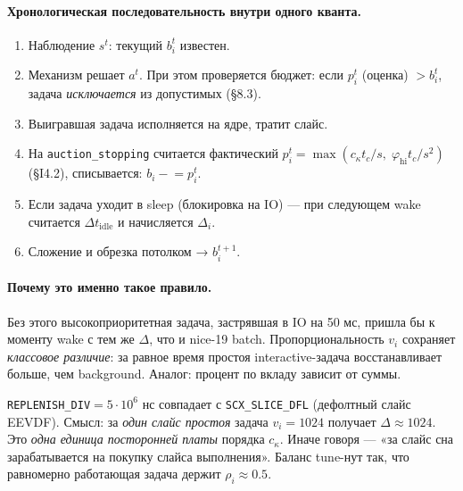 \documentclass[11pt,a4paper]{article}
\begin{document}
\paragraph{Хронологическая последовательность внутри одного кванта.}
\begin{enumerate}[leftmargin=*]
  \item Наблюдение $s^t$: текущий $b_i^t$ известен.
  \item Механизм решает $a^t$. При этом проверяется бюджет:
    если $p_i^t$ (оценка) $> b_i^t$, задача \emph{исключается} из
    допустимых (§8.3).
  \item Выигравшая задача исполняется на ядре, тратит слайс.
  \item На \texttt{auction\_stopping} считается фактический
    $p_i^t = \max(c_\kappa t_c/s,\; \varphi_{\text{hi}} t_c/s^2)$
    (§I4.2), списывается: $b_i \mathrel{-}= p_i^t$.
  \item Если задача уходит в sleep (блокировка на IO) — при
    следующем wake считается $\Delta t_{\text{idle}}$ и начисляется
    $\Delta_i$.
  \item Сложение и обрезка потолком → $b_i^{t+1}$.
\end{enumerate}

\paragraph{Почему это именно такое правило.}

\begin{why}
Без этого высокоприоритетная задача, застрявшая в IO на 50 мс,
пришла бы к моменту wake с тем же $\Delta$, что и nice-19 batch.
Пропорциональность $v_i$ сохраняет \emph{классовое различие}: за
равное время простоя interactive-задача восстанавливает больше,
чем background. Аналог: процент по вкладу зависит от суммы.
\end{why}

\begin{why}[Откуда берётся $D_{\text{rep}}=5$ мс]
\texttt{REPLENISH\_DIV}$=5\cdot 10^6$ нс совпадает с
\texttt{SCX\_SLICE\_DFL} (дефолтный слайс EEVDF). Смысл: за
\emph{один слайс простоя} задача $v_i=1024$ получает
$\Delta\approx 1024$. Это \emph{одна единица посторонней платы}
порядка $c_\kappa$. Иначе говоря — «за слайс сна зарабатывается
на покупку слайса выполнения». Баланс tune-нут так, что
равномерно работающая задача держит $\rho_i\approx 0.5$.
\end{why}
\end{document}
